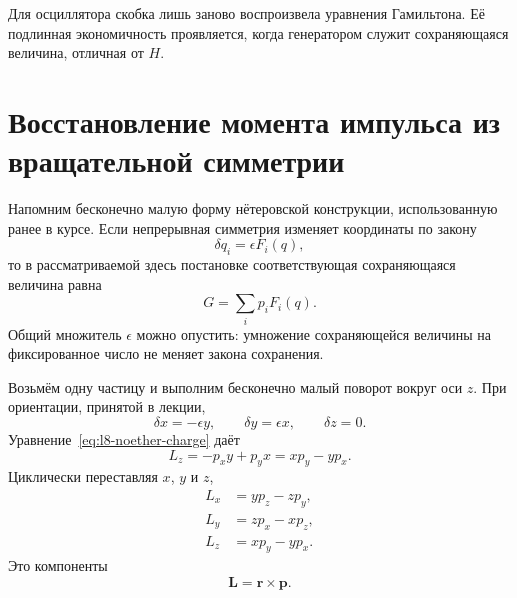 \begin{classroomqa}
\end{classroomqa}

Для осциллятора скобка лишь заново воспроизвела уравнения Гамильтона.
Её подлинная экономичность проявляется, когда генератором служит сохраняющаяся величина, отличная от
\(H\).

\section{Восстановление момента импульса из вращательной симметрии}

Напомним бесконечно малую форму нётеровской конструкции, использованную ранее в курсе. Если непрерывная симметрия изменяет координаты по закону
\begin{equation}
  \delta q_i=\epsilon F_i(q),
  \label{eq:l8-noether-variation}
\end{equation}
то в рассматриваемой здесь постановке соответствующая сохраняющаяся величина равна
\begin{equation}
  G=\sum_i p_iF_i(q).
  \label{eq:l8-noether-charge}
\end{equation}
Общий множитель \(\epsilon\) можно опустить: умножение сохраняющейся величины на фиксированное число не меняет закона сохранения.

Возьмём одну частицу и выполним бесконечно малый поворот вокруг оси \(z\). При ориентации, принятой в лекции,
\begin{equation}
  \delta x=-\epsilon y,\qquad
  \delta y=\epsilon x,\qquad
  \delta z=0.
  \label{eq:l8-z-rotation}
\end{equation}
Уравнение~\eqref{eq:l8-noether-charge} даёт
\begin{equation}
  L_z=-p_xy+p_yx=xp_y-yp_x.
  \label{eq:l8-lz}
\end{equation}
Циклически переставляя \(x\), \(y\) и \(z\),
\begin{equation}
  \boxed{\begin{aligned}
    L_x&=yp_z-zp_y,\\
    L_y&=zp_x-xp_z,\\
    L_z&=xp_y-yp_x.
  \end{aligned}}
  \label{eq:l8-angular-components}
\end{equation}
Это компоненты
\begin{equation}
  \boldsymbol L=\boldsymbol r\times\boldsymbol p.
  \label{eq:l8-cross-product}
\end{equation}

